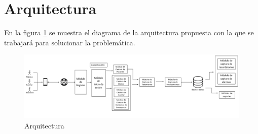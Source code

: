 \section{Arquitectura}

En la figura \ref{fig:arquitectura1} se muestra el diagrama de la arquitectura propuesta con la que se trabajará para solucionar la problemática.


\begin{figure}[htb]
	\centering
	\includegraphics[width=1\textwidth]{images/cap2/Arquitectura4}
	\caption{Arquitectura} \label{fig:arquitectura1}
\end{figure}

